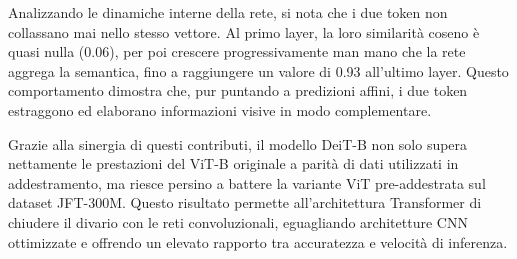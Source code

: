 Analizzando le dinamiche interne della rete, si nota che i due token non
collassano mai nello stesso vettore. Al primo layer, la loro similarità coseno
è quasi nulla (0.06), per poi crescere progressivamente man mano che la rete
aggrega la semantica, fino a raggiungere un valore di 0.93 all'ultimo layer.
Questo comportamento dimostra che, pur puntando a predizioni affini, i due
token estraggono ed elaborano informazioni visive in modo complementare. \par
Grazie alla sinergia di questi contributi, il modello DeiT-B non solo supera
nettamente le prestazioni del ViT-B originale a parità di dati utilizzati in
addestramento, ma riesce persino a battere la variante ViT pre-addestrata sul
dataset JFT-300M. Questo risultato permette all'architettura Transformer di
chiudere il divario con le reti convoluzionali, eguagliando architetture CNN
ottimizzate e offrendo un elevato rapporto tra accuratezza e velocità di
inferenza.

